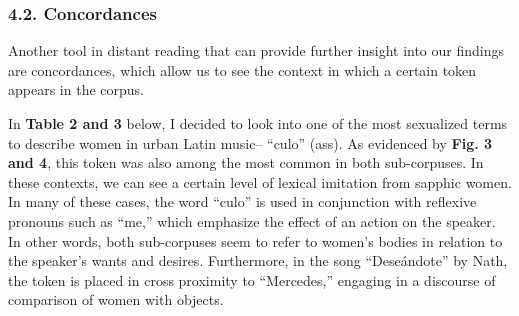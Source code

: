 \documentclass[
  letterpaper,
  DIV=11,
  numbers=noendperiod]{scrartcl}
\begin{document}
\hypertarget{concordances}{%
\subsubsection{4.2. Concordances}\label{concordances}}

Another tool in distant reading that can provide further insight into
our findings are concordances, which allow us to see the context in
which a certain token appears in the corpus.

In \textbf{Table 2 and 3} below, I decided to look into one of the most
sexualized terms to describe women in urban Latin music-- ``culo''
(ass). As evidenced by \textbf{Fig. 3 and 4}, this token was also among
the most common in both sub-corpuses. In these contexts, we can see a
certain level of lexical imitation from sapphic women. In many of these
cases, the word ``culo'' is used in conjunction with reflexive pronouns
such as ``me,'' which emphasize the effect of an action on the speaker.
In other words, both sub-corpuses seem to refer to women's bodies in
relation to the speaker's wants and desires. Furthermore, in the song
``Deseándote'' by Nath, the token is placed in cross proximity to
``Mercedes,'' engaging in a discourse of comparison of women with
objects.
\end{document}
